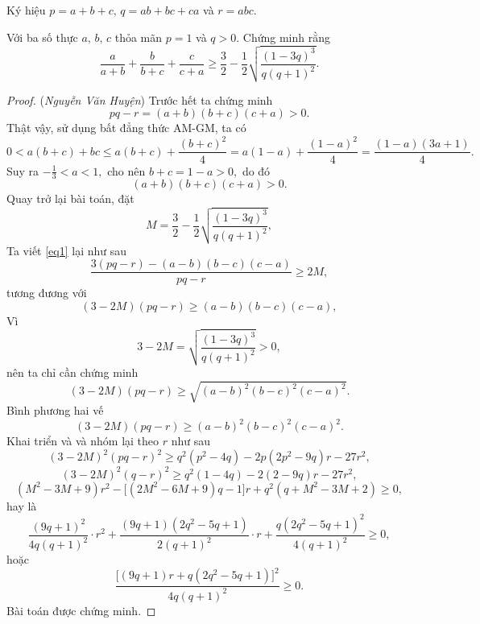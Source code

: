 \documentclass[12pt,a4paper]{book}
\def\nvh{{\it Nguyễn Văn Huyện}}
\begin{document}
Ký hiệu $p=a+b+c,\,q=ab+bc+ca$ và $r=abc.$
\begin{bt}
Với ba số thực $a,\,b,\,c$ thỏa mãn $p=1$ và $q>0.$ Chứng minh rằng
\begin{equation}\label{eq1}
\frac{a}{a+b}+\frac{b}{b+c}+\frac{c}{c+a} \ge \frac{3}{2} - \frac{1}{2}\sqrt{\frac{(1-3q)^3}{q(q+1)^2}}.
\end{equation}
\end{bt}

\begin{proof} (\nvh) Trước hết ta chứng minh
\[pq-r = (a+b)(b+c)(c+a)>0.\]
Thật vậy, sử dụng bất đẳng thức AM-GM, ta có
\[0 < a(b+c)+bc \leqslant a(b+c)+\frac{(b+c)^2}{4}=a(1-a)+\frac{(1-a)^2}{4} = \frac{(1-a)(3a+1)}{4}.\]
Suy ra $- \frac{1}{3} < a < 1,$ cho nên $b+c=1-a>0,$ do đó
\[(a+b)(b+c)(c+a)>0.\]
Quay trở lại bài toán, đặt
\[M = \frac{3}{2} - \frac{1}{2}\sqrt{\frac{(1-3q)^3}{q(q+1)^2}},\]
Ta viết \eqref{eq1} lại như sau
\[\frac{3(pq-r)-(a-b)(b-c)(c-a)}{pq-r} \geq 2M,\]
tương đương với
\[(3 - 2M)(pq-r) \ge (a-b)(b-c)(c-a),\]
Vì 
\[3 - 2M = \sqrt{\frac{(1-3q)^3}{q(q+1)^2}}>0,\]
nên ta chỉ cần chứng minh
\[(3 - 2M)(pq-r) \ge \sqrt{(a-b)^2(b-c)^2(c-a)^2}.\]
Bình phương hai vế
\[(3 - 2M)(pq-r) \ge (a-b)^2(b-c)^2(c-a)^2.\]
Khai triển và và nhóm lại theo $r$ như sau
\[(3 - 2M)^2(pq-r)^2 \ge q^2(p^2-4q)-2p(2p^2-9q)r-27r^2,\]
\[(3 - 2M)^2(q-r)^2 \ge q^2(1-4q)-2(2-9q)r-27r^2,\]
\[(M^2-3M+9)r^2-\big[(2M^2-6M+9)q-1\big]r+q^2(q+M^2-3M+2) \ge 0,\]
hay là
\[\frac{(9q+1)^2}{4q(q+1)^2} \cdot r^2 + \frac{(9q+1)(2q^2-5q+1)}{2(q+1)^2}\cdot r+\frac{q(2q^2-5q+1)^2}{4(q+1)^2} \ge 0,\]
hoặc
\[\frac{\big[(9q+1)r+q(2q^2-5q+1)\big]^2}{4q(q+1)^2} \ge 0.\]
Bài toán được chứng minh.
\end{proof}
\end{document}
